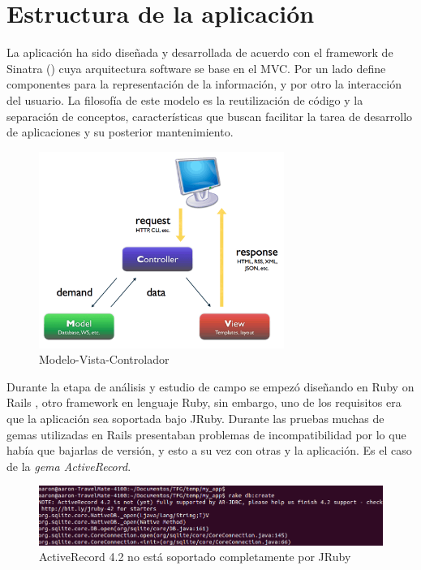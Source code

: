 \vspace*{0.2in}
\section{Estructura de la aplicación}\label{cap.4.2}
La aplicación ha sido diseñada y desarrollada de acuerdo con el framework de Sinatra (\cite{URL:Sinatra}) cuya arquitectura software se base en el MVC. Por un lado define componentes para la representación de la información, y por otro la interacción del usuario. La filosofía de este modelo es la reutilización de código y la separación de conceptos, características que buscan facilitar la tarea de desarrollo de aplicaciones y su posterior mantenimiento. \\

\begin{figure}[H]
	\centering
	\includegraphics[width=8cm]{./images/mvc.png}
	\caption{Modelo-Vista-Controlador} \label{fig:MVC}
\end{figure}

Durante la etapa de análisis y estudio de campo se empezó diseñando en Ruby on Rails \cite{URL:Rails}, otro framework en lenguaje Ruby, sin embargo, uno de los requisitos era que la aplicación sea soportada bajo JRuby. Durante las pruebas muchas de gemas utilizadas en Rails presentaban problemas de incompatibilidad por lo que había que bajarlas de versión, y esto a su vez con otras y la aplicación. Es el caso de la \emph{gema ActiveRecord}. 

\begin{figure}[H]
	\centering
	\includegraphics[width=12cm]{./images/activerecord-message.png}
	\caption{ActiveRecord 4.2 no está soportado completamente por JRuby} \label{fig:AvtiveRecord-no-supported}
\end{figure}

